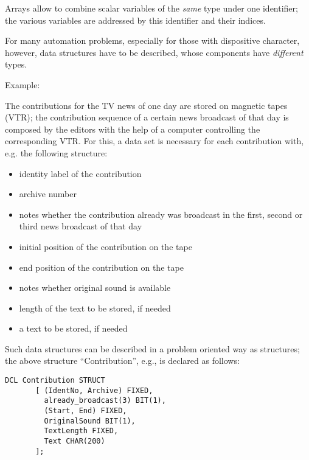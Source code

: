 Arrays allow to combine scalar variables of the {\it same} type under
one identifier; the various variables are addressed by this identifier
and their indices.

For many automation problems, especially for those with dispositive
character, however, data structures have to be described, whose
components have {\it different} types.

Example:

The contributions for the TV news of one day are stored on magnetic
tapes (VTR); the contribution sequence of a certain news broadcast of
that day is composed by the editors with the help of a computer
controlling the corresponding VTR. For this, a data set is necessary for
each contribution with, e.g. the following structure:

\begin{itemize}
\item identity label of the contribution
\item archive number
\item notes whether the contribution already was broadcast in the first,
second or third news broadcast of that day
\item initial position of the contribution on the tape
\item end position of the contribution on the tape
\item notes whether original sound is available
\item length of the text to be stored, if needed
\item a text to be stored, if needed
\end{itemize}

Such data structures can be described in a problem oriented way as
structures; the above structure ``Contribution'', e.g., is declared as
follows:

\begin{lstlisting}
DCL Contribution STRUCT 
       [ (IdentNo, Archive) FIXED,
         already_broadcast(3) BIT(1),
         (Start, End) FIXED,
         OriginalSound BIT(1),
         TextLength FIXED,
         Text CHAR(200)
       ];
\end{lstlisting}


